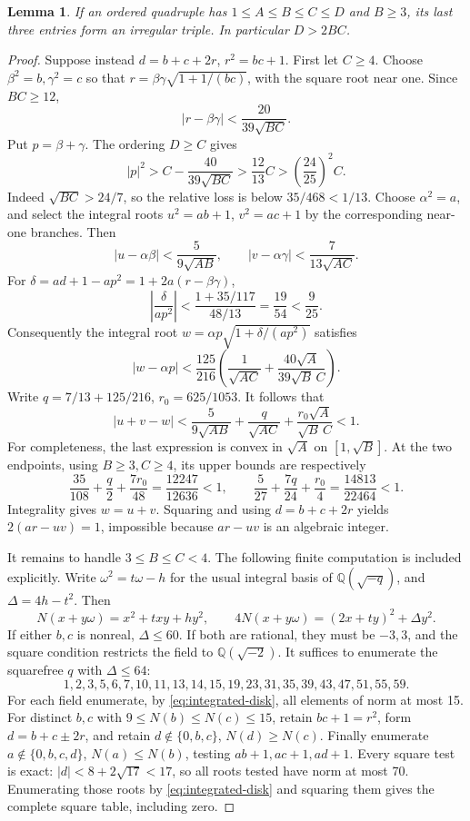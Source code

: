 \documentclass[12pt]{article}
\newtheorem{lemma}[theorem]{Lemma}
\numberwithin{equation}{section}
\begin{document}
\begin{lemma}\label{lem:tail-irregular}
If an ordered quadruple has \(1\le A\le B\le C\le D\) and \(B\ge3\),
its last three entries form an irregular triple. In particular \(D>2BC\).
\end{lemma}
\begin{proof}
Suppose instead \(d=b+c+2r\), \(r^2=bc+1\). First let \(C\ge4\).
Choose \(\beta^2=b,\gamma^2=c\) so that
\(r=\beta\gamma\sqrt{1+1/(bc)}\), with the square root near one.
Since \(BC\ge12\),
\[
 |r-\beta\gamma|<\frac{20}{39\sqrt{BC}}.
\]
Put \(p=\beta+\gamma\). The ordering \(D\ge C\) gives
\[
 |p|^2>C-\frac{40}{39\sqrt{BC}}>
 \frac{12}{13}C>\left(\frac{24}{25}\right)^2C.
\]
Indeed \(\sqrt{BC}>24/7\), so the relative loss is below
\(35/468<1/13\).
Choose \(\alpha^2=a\), and select the integral roots \(u^2=ab+1\),
\(v^2=ac+1\) by the corresponding near-one branches. Then
\[
 |u-\alpha\beta|<\frac5{9\sqrt{AB}},\qquad
 |v-\alpha\gamma|<\frac7{13\sqrt{AC}}.
\]
For \(\delta=ad+1-ap^2=1+2a(r-\beta\gamma)\),
\[
 \left|\frac{\delta}{ap^2}\right|
 <\frac{1+35/117}{48/13}=\frac{19}{54}<\frac9{25}.
\]
Consequently the integral root
\(w=\alpha p\sqrt{1+\delta/(ap^2)}\) satisfies
\[
 |w-\alpha p|<
 \frac{125}{216}\left(\frac1{\sqrt{AC}}
       +\frac{40\sqrt A}{39\sqrt B\,C}\right).
\]
Write \(q=7/13+125/216\), \(r_0=625/1053\). It follows that
\[
 |u+v-w|<
 \frac5{9\sqrt{AB}}+\frac q{\sqrt{AC}}
                    +\frac{r_0\sqrt A}{\sqrt B\,C}<1.
\]
For completeness, the last expression is convex in \(\sqrt A\)
on \([1,\sqrt B]\). At the two endpoints, using \(B\ge3,C\ge4\),
its upper bounds are respectively
\[
 \frac{35}{108}+\frac q2+\frac{7r_0}{48}
   =\frac{12247}{12636}<1,\qquad
 \frac5{27}+\frac{7q}{24}+\frac{r_0}{4}
   =\frac{14813}{22464}<1.
\]
Integrality gives \(w=u+v\). Squaring and using
\(d=b+c+2r\) yields \(2(ar-uv)=1\), impossible because
\(ar-uv\) is an algebraic integer.

It remains to handle \(3\le B\le C<4\). The following finite computation
is included explicitly. Write
\(\omega^2=t\omega-h\) for the usual integral basis of
\(\mathbb Q(\sqrt{-q})\), and \(\Delta=4h-t^2\). Then
\begin{equation}\label{eq:integrated-disk}
N(x+y\omega)=x^2+txy+hy^2,\qquad
 4N(x+y\omega)=(2x+ty)^2+\Delta y^2.
\end{equation}
If either \(b,c\) is nonreal, \(\Delta\le60\). If both are rational,
they must be \(-3,3\), and the square condition restricts the field to
\(\mathbb Q(\sqrt{-2})\). It suffices to enumerate the squarefree \(q\)
with \(\Delta\le64\):
\[
 1,2,3,5,6,7,10,11,13,14,15,19,23,31,35,39,43,47,51,55,59.
\]
For each field enumerate, by \eqref{eq:integrated-disk}, all elements of norm at most 15.
For distinct \(b,c\) with \(9\le N(b)\le N(c)\le15\), retain
\(bc+1=r^2\), form \(d=b+c\pm2r\), and retain
\(d\notin\{0,b,c\}\), \(N(d)\ge N(c)\). Finally enumerate
\(a\notin\{0,b,c,d\}\), \(N(a)\le N(b)\), testing \(ab+1,ac+1,ad+1\).
Every square test is exact: \(|d|<8+2\sqrt{17}<17\), so all roots
tested have norm at most 70. Enumerating those roots by \eqref{eq:integrated-disk} and squaring
them gives the complete square table, including zero.


\end{proof}
\end{document}

